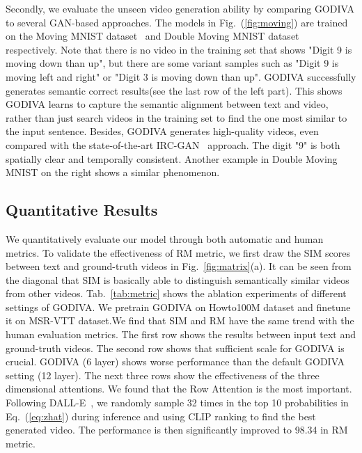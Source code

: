 \documentclass{article}
\begin{document}
Secondly, we evaluate the unseen video generation ability by comparing GODIVA to several GAN-based approaches. The models in Fig.~(\ref{fig:moving}) are trained on the Moving MNIST dataset~\cite{mittalSyncdrawAutomaticVideo2017} and Double Moving MNIST dataset~\cite{mittalSyncdrawAutomaticVideo2017} respectively. Note that there is no video in the training set that shows "Digit 9 is moving down than up", but there are some variant samples such as "Digit 9 is moving left and right" or "Digit 3 is moving down than up". GODIVA successfully generates semantic correct results(see the last row of the left part). This shows GODIVA learns to capture the semantic alignment between text and video, rather than just search videos in the training set to find the one most similar to the input sentence. Besides, GODIVA generates high-quality videos, even compared with the state-of-the-art IRC-GAN~\cite{mittalSyncdrawAutomaticVideo2017} approach. The digit "9" is both spatially clear and temporally consistent. Another example in Double Moving MNIST on the right shows a similar phenomenon.


\subsection{Quantitative Results}
We quantitatively evaluate our model through both automatic and human metrics. To validate the effectiveness of RM metric, we first draw the SIM scores between text and ground-truth videos in Fig.~\ref{fig:matrix}(a). It can be seen from the diagonal that SIM is basically able to distinguish semantically similar videos from other videos. Tab.~\ref{tab:metric} shows the ablation experiments of different settings of GODIVA. We pretrain GODIVA on Howto100M dataset and finetune it on MSR-VTT dataset.We find that SIM and RM have the same trend with the human evaluation metrics. The first row shows the results between input text and ground-truth videos. The second row shows that sufficient scale for GODIVA is crucial. GODIVA (6 layer) shows worse performance than the default GODIVA setting (12 layer). The next three rows show the effectiveness of the three dimensional attentions. We found that the Row Attention is the most important. Following DALL-E~\cite{rameshZeroShotTexttoImageGeneration2021}, we randomly sample 32 times in the top 10 probabilities in Eq.~(\ref{eq:zhat}) during inference and using CLIP ranking to find the best generated video. The performance is then significantly improved to 98.34 in RM metric. 
\end{document}
